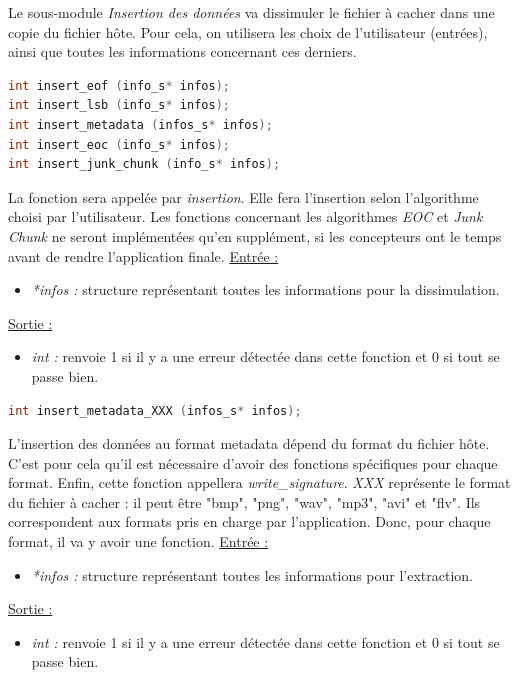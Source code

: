 \documentclass[11pt]{article}
\begin{document}
Le sous-module \textit{Insertion des données} va dissimuler 
le fichier à cacher dans une copie du fichier hôte. Pour cela, on utilisera 
les choix de l'utilisateur (entrées), ainsi que toutes les informations 
concernant ces derniers. 

\begin{lstlisting}[language=c]
int insert_eof (info_s* infos); 
int insert_lsb (info_s* infos);
int insert_metadata (infos_s* infos);
int insert_eoc (info_s* infos);
int insert_junk_chunk (info_s* infos);
\end{lstlisting}

La fonction sera appelée par \textit{insertion}.
Elle fera l'insertion selon l'algorithme choisi par l'utilisateur. 
Les fonctions concernant les algorithmes \textit{EOC} et \textit{Junk Chunk} 
ne seront implémentées qu'en supplément, si les concepteurs ont le temps 
avant de rendre l'application finale. 
\newline
\underline{Entrée :} 
\begin{itemize}
\item \textit{*infos :} structure représentant toutes les informations pour 
la dissimulation.  
\end{itemize}
\underline{Sortie :} 
\begin{itemize}
\item \textit{int :} renvoie 1 si il y a une erreur détectée dans cette 
fonction et 0 si tout se passe bien.  
\newline 
\end{itemize}

\begin{lstlisting}[language=c]
int insert_metadata_XXX (infos_s* infos);
\end{lstlisting}

L'insertion des données au format metadata dépend du format du fichier hôte. 
C'est pour cela qu'il est nécessaire d'avoir des fonctions spécifiques pour 
chaque format. 
Enfin, cette fonction appellera \textit{write\_signature}.
\textit{XXX} représente le format du fichier à cacher : il peut être 
"bmp", "png", "wav", "mp3", "avi" et "flv". Ils correspondent aux formats 
pris en charge par l'application. Donc, pour chaque format, il va y avoir 
une fonction.  
\newline
\underline{Entrée :} 
\begin{itemize}
\item \textit{*infos :} structure représentant toutes les informations pour 
l'extraction. 
\end{itemize}
\underline{Sortie :} 
\begin{itemize}
\item \textit{int :} renvoie 1 si il y a une erreur détectée dans cette 
fonction et 0 si tout se passe bien.  
\newline 
\end{itemize}
\end{document}
